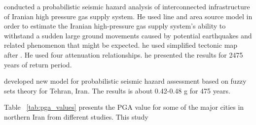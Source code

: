 \noindent
\citet{Golara2014} conducted a probabilistic seismic hazard analysis of interconnected infrastructure of Iranian high pressure gas supply system. He used line and area source model in order to estimate the Iranian  high-pressure gas supply system's ability to withstand a sudden large ground movements caused by potential earthquakes and related phenomenon that might be expected. he used simplified tectonic map after \citet{Alavi1991}. He used four attenuation relationships. he presented the results for 2475 years of return period. 

\noindent
\citet{Boostan2015} developed new model for probabilistic seismic hazard assessment based on fuzzy sets theory for Tehran, Iran. The results is about 0.42-0.48 g for 475 years. 

Table ~\ref{tab:pga_values} presents the PGA value for some of the major cities in northern Iran from different studies. This study 



